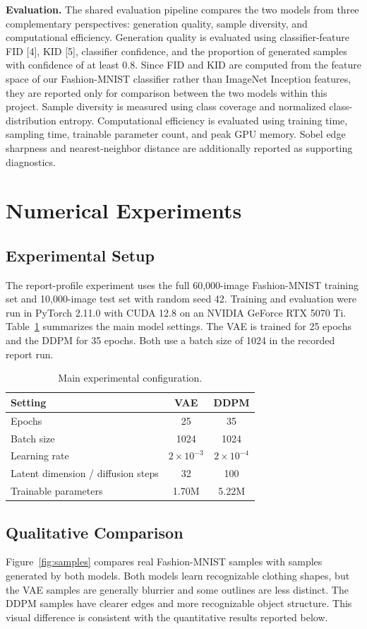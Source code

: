 \documentclass{article}
\begin{document}
\textbf{Evaluation.}
The shared evaluation pipeline compares the two models from three complementary perspectives: generation quality, sample diversity, and computational efficiency. Generation quality is evaluated using classifier-feature FID [4], KID [5], classifier confidence, and the proportion of generated samples with confidence of at least 0.8. Since FID and KID are computed from the feature space of our Fashion-MNIST classifier rather than ImageNet Inception features, they are reported only for comparison between the two models within this project. Sample diversity is measured using class coverage and normalized class-distribution entropy. Computational efficiency is evaluated using training time, sampling time, trainable parameter count, and peak GPU memory. Sobel edge sharpness and nearest-neighbor distance are additionally reported as supporting diagnostics.

\section{Numerical Experiments}
\subsection{Experimental Setup}
The report-profile experiment uses the full 60,000-image Fashion-MNIST training set and 10,000-image test set with random seed 42. Training and evaluation were run in PyTorch 2.11.0 with CUDA 12.8 on an NVIDIA GeForce RTX 5070 Ti. Table~\ref{tab:config} summarizes the main model settings. The VAE is trained for 25 epochs and the DDPM for 35 epochs. Both use a batch size of 1024 in the recorded report run.

\begin{table}[t]
\caption{Main experimental configuration.}
\label{tab:config}
\centering
\small
\begin{tabular}{lcc}
\toprule
Setting & VAE & DDPM \\
\midrule
Epochs & 25 & 35 \\
Batch size & 1024 & 1024 \\
Learning rate & $2\times10^{-3}$ & $2\times10^{-4}$ \\
Latent dimension / diffusion steps & 32 & 100 \\
Trainable parameters & 1.70M & 5.22M \\
\bottomrule
\end{tabular}
\end{table}

\subsection{Qualitative Comparison}
Figure~\ref{fig:samples} compares real Fashion-MNIST samples with samples generated by both models. Both models learn recognizable clothing shapes, but the VAE samples are generally blurrier and some outlines are less distinct. The DDPM samples have clearer edges and more recognizable object structure. This visual difference is consistent with the quantitative results reported below.
\end{document}
